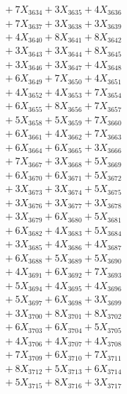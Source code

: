 \documentclass[a4paper,10pt]{article}
\begin{document}
{\begin{align}
&\;  + 7 X_{3634} + 3 X_{3635} + 4 X_{3636} \\[0.3ex]
&\;  + 7 X_{3637} + 3 X_{3638} + 3 X_{3639} \\[0.5ex]\allowbreak
&\;  + 4 X_{3640} + 8 X_{3641} + 8 X_{3642} \\[0.3ex]
&\;  + 3 X_{3643} + 3 X_{3644} + 8 X_{3645} \\[0.3ex]
&\;  + 3 X_{3646} + 3 X_{3647} + 4 X_{3648} \\[0.3ex]
&\;  + 6 X_{3649} + 7 X_{3650} + 4 X_{3651} \\[0.3ex]
&\;  + 4 X_{3652} + 4 X_{3653} + 7 X_{3654} \\[0.3ex]
&\;  + 6 X_{3655} + 8 X_{3656} + 7 X_{3657} \\[0.3ex]
&\;  + 5 X_{3658} + 5 X_{3659} + 7 X_{3660} \\[0.3ex]
&\;  + 6 X_{3661} + 4 X_{3662} + 7 X_{3663} \\[0.3ex]
&\;  + 6 X_{3664} + 6 X_{3665} + 3 X_{3666} \\[0.3ex]
&\;  + 7 X_{3667} + 3 X_{3668} + 5 X_{3669} \\[0.5ex]\allowbreak
&\;  + 6 X_{3670} + 6 X_{3671} + 5 X_{3672} \\[0.3ex]
&\;  + 3 X_{3673} + 3 X_{3674} + 5 X_{3675} \\[0.3ex]
&\;  + 3 X_{3676} + 3 X_{3677} + 3 X_{3678} \\[0.3ex]
&\;  + 3 X_{3679} + 6 X_{3680} + 5 X_{3681} \\[0.3ex]
&\;  + 6 X_{3682} + 4 X_{3683} + 5 X_{3684} \\[0.3ex]
&\;  + 3 X_{3685} + 4 X_{3686} + 4 X_{3687} \\[0.3ex]
&\;  + 6 X_{3688} + 5 X_{3689} + 5 X_{3690} \\[0.3ex]
&\;  + 4 X_{3691} + 6 X_{3692} + 7 X_{3693} \\[0.3ex]
&\;  + 5 X_{3694} + 4 X_{3695} + 4 X_{3696} \\[0.3ex]
&\;  + 5 X_{3697} + 6 X_{3698} + 3 X_{3699} \\[0.5ex]\allowbreak
&\;  + 3 X_{3700} + 8 X_{3701} + 8 X_{3702} \\[0.3ex]
&\;  + 6 X_{3703} + 6 X_{3704} + 5 X_{3705} \\[0.3ex]
&\;  + 4 X_{3706} + 4 X_{3707} + 4 X_{3708} \\[0.3ex]
&\;  + 7 X_{3709} + 6 X_{3710} + 7 X_{3711} \\[0.3ex]
&\;  + 8 X_{3712} + 5 X_{3713} + 6 X_{3714} \\[0.3ex]
&\;  + 5 X_{3715} + 8 X_{3716} + 3 X_{3717} \\[0.3ex]

\end{align}}
\end{document}
